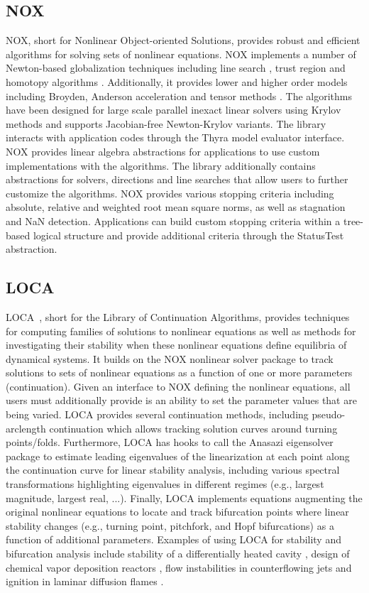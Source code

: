 \subsection{NOX}
NOX, short for Nonlinear Object-oriented Solutions, provides robust and efficient algorithms for solving sets of nonlinear equations.
NOX implements a number of Newton-based globalization techniques including line search \cite{Pawlowski2006}, trust region \cite{Pawlowski2006,Pawlowski2008} and homotopy algorithms \cite{Coffey2003}.
Additionally, it provides lower and higher order models including Broyden, Anderson acceleration \cite{Walker2011} and tensor methods \cite{Bader2005}.
The algorithms have been designed for large scale parallel inexact linear solvers using Krylov methods and supports Jacobian-free Newton-Krylov variants.
The library interacts with application codes through the Thyra model evaluator interface.
NOX provides linear algebra abstractions for applications to use custom implementations with the algorithms.
The library additionally contains abstractions for solvers, directions and line searches that allow users to further customize the algorithms.
NOX provides various stopping criteria including absolute, relative and weighted root mean square norms, as well as stagnation and NaN detection.
Applications can build custom stopping criteria within a tree-based logical structure and provide additional criteria through the StatusTest abstraction.

\subsection{LOCA}
LOCA~\cite{Salinger2005}, short for the Library of Continuation Algorithms, provides techniques for computing families of solutions to nonlinear equations as well as methods for investigating their stability when these nonlinear equations define equilibria of dynamical systems.  It builds on the NOX nonlinear solver package to track solutions to sets of nonlinear equations as a function of one or more parameters (continuation).  Given an interface to NOX defining the nonlinear equations, all users must additionally provide is an ability to set the parameter values that are being varied.  LOCA provides several continuation methods, including pseudo-arclength continuation which allows tracking solution curves around turning points/folds.  Furthermore, LOCA has hooks to call the Anasazi eigensolver package to estimate leading eigenvalues of the linearization at each point along the continuation curve for linear stability analysis, including various spectral transformations highlighting eigenvalues in different regimes (e.g., largest magnitude, largest real, ...).  Finally, LOCA implements equations augmenting the original nonlinear equations to locate and track bifurcation points where linear stability changes (e.g., turning point, pitchfork, and Hopf bifurcations) as a function of additional parameters. Examples of using LOCA for stability and bifurcation analysis include stability of a differentially heated cavity \cite{Salinger2002}, design of chemical vapor deposition reactors \cite{Pawlowski2001}, flow instabilities in counterflowing jets \cite{pawlowski_salinger_shadid_mountziaris_2006} and ignition in laminar diffusion flames \cite{Shadid20061846}.

